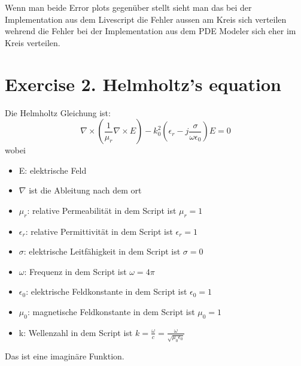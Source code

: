 \documentclass{scrartcl}
\begin{document}
Wenn man beide Error plots gegenüber stellt sieht man das bei der Implementation aus dem Livescript die Fehler aussen am Kreis sich verteilen wehrend die Fehler bei der Implementation aus dem PDE Modeler sich eher im Kreis verteilen.\\

\section*{Exercise 2. Helmholtz's equation}
Die Helmholtz Gleichung ist:\\
\begin{equation*}
    \nabla\times \left(\frac1{\mu_r}\nabla\times E\right)- k_0^2\left(\epsilon_r-j\frac{\sigma}{\omega\epsilon_0}\right)E = 0
\end{equation*} wobei
\begin{itemize}
    \item E: elektrische Feld
    \item $\nabla$ ist die Ableitung nach dem ort
    \item $\mu_r$: relative Permeabilität in dem Script ist $\mu_r = 1$
    \item $\epsilon_r$: relative Permittivität in dem Script ist $\epsilon_r = 1$
    \item $\sigma$: elektrische Leitfähigkeit in dem Script ist $\sigma = 0$
    \item $\omega$: Frequenz in dem Script ist $\omega = 4\pi$
    \item $\epsilon_0$: elektrische Feldkonstante in dem Script ist $\epsilon_0 = 1$
    \item $\mu_0$: magnetische Feldkonstante in dem Script ist $\mu_0 = 1$
    \item k: Wellenzahl in dem Script ist $k = \frac{\omega}{c} = \frac{\omega}{\sqrt{\mu_0\epsilon_0}}$
\end{itemize}
Das ist eine imaginäre Funktion.\\
\end{document}
